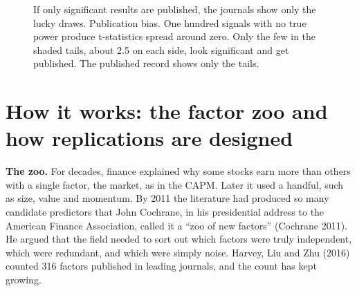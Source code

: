 \begin{figure}[htbp]
\centering
{}
\caption{If only significant results are published, the journals show only the lucky draws. Publication bias. One hundred signals with no true power produce t-statistics spread around zero. Only the few in the shaded tails, about 2.5 on each side, look significant and get published. The published record shows only the tails.}
\label{fig:19-pubbias}
\end{figure}

\section{How it works: the factor zoo and how replications are designed}
\label{sec:19-how}

\textbf{The zoo.} For decades, finance explained why some stocks earn more than others with a single factor, the market, as in the CAPM. Later it used a handful, such as size, value and momentum. By 2011 the literature had produced so many candidate predictors that John Cochrane, in his presidential address to the American Finance Association, called it a ``zoo of new factors'' (Cochrane 2011). He argued that the field needed to sort out which factors were truly independent, which were redundant, and which were simply noise. Harvey, Liu and Zhu (2016) counted 316 factors published in leading journals, and the count has kept growing.

